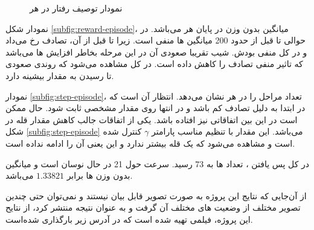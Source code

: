 \begin{figure}
	\centering
	\caption{نمودار توصیف رفتار  در هر }
	\label{fig:episode-chart}
\end{figure}

نمودار شکل \ref{subfig:reward-episode}، میانگین بدون وزن  در پایان هر  می‌باشد. در حوالی تا قبل از حدود 200 میانگین  ها منفی است. زیرا تا قبل از آن، تصادف رخ می‌داد و در کل منفی بودش. شیب تقریبا صعودی آن در این مرحله بخاطر افزایش ها می‌باشد که تاثیر منفی تصادف را کاهش داده است. در کل مشاهده می‌شود که روندی صعودی تا رسیدن به مقدار بیشینه  دارد.

نمودار \ref{subfig:step-episode}، تعداد مراحل را در هر  نشان می‌دهد. انتظار آن است که در ابتدا به دلیل تصادف کم باشد و در انتها روی مقدار مشخصی ثابت شود. حال ممکن است در این بین اتفاقاتی نیز افتاده باشد. یکی از اتفاقات جالب کاهش مقدار قله در شکل \ref{subfig:step-episode} می‌باشد. این مقدار با تنظیم مناسب پارامتر $\gamma$ کنترل شده است و مشاهده می‌شود که یک قله بیشتر ندارد و این یعنی آن  را ادامه نداده است.

در کل پس یافتن ، تعداد ها به 73 رسید. سرعت  حول 21 در حال نوسان است و میانگین بدون وزن ها برابر $1.33821$ می‌باشد.

از آن‌جایی که نتایج این پروژه به صورت تصویر قابل بیان نیستند و نمی‌توان حتی چندین تصویر مختلف از وضعیت های مختلف آن گرفت و به عنوان نتیجه منتشر کرد، 
از نتایح این پروژه، فیلمی تهیه شده است که در آدرس زیر بارگذاری شده‌است.
\begin{center}
\end{center}




